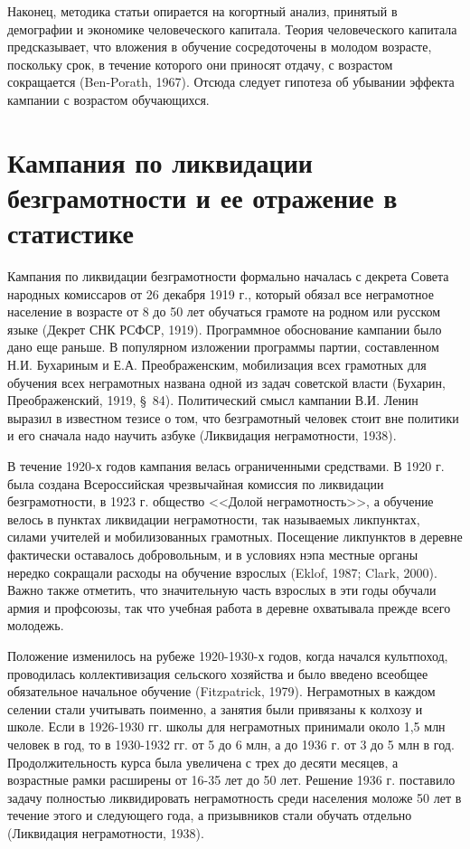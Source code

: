 \documentclass[12pt]{article}
\begin{document}
Наконец, методика статьи опирается на когортный анализ, принятый в демографии и экономике человеческого капитала. Теория человеческого капитала предсказывает, что вложения в обучение сосредоточены в молодом возрасте, поскольку срок, в течение которого они приносят отдачу, с возрастом сокращается (Ben-Porath, 1967). Отсюда следует гипотеза об убывании эффекта кампании с возрастом обучающихся.

\section{Кампания по ликвидации безграмотности и ее отражение в статистике}

Кампания по ликвидации безграмотности формально началась с декрета Совета народных комиссаров от 26 декабря 1919 г., который обязал все неграмотное население в возрасте от 8 до 50 лет обучаться грамоте на родном или русском языке (Декрет СНК РСФСР, 1919). Программное обоснование кампании было дано еще раньше. В популярном изложении программы партии, составленном Н.И. Бухариным и Е.А. Преображенским, мобилизация всех грамотных для обучения всех неграмотных названа одной из задач советской власти (Бухарин, Преображенский, 1919, §~84). Политический смысл кампании В.И. Ленин выразил в известном тезисе о том, что безграмотный человек стоит вне политики и его сначала надо научить азбуке (Ликвидация неграмотности, 1938).

В течение 1920-х годов кампания велась ограниченными средствами. В 1920 г. была создана Всероссийская чрезвычайная комиссия по ликвидации безграмотности, в 1923 г. общество <<Долой неграмотность>>, а обучение велось в пунктах ликвидации неграмотности, так называемых ликпунктах, силами учителей и мобилизованных грамотных. Посещение ликпунктов в деревне фактически оставалось добровольным, и в условиях нэпа местные органы нередко сокращали расходы на обучение взрослых (Eklof, 1987; Clark, 2000). Важно также отметить, что значительную часть взрослых в эти годы обучали армия и профсоюзы, так что учебная работа в деревне охватывала прежде всего молодежь.

Положение изменилось на рубеже 1920-1930-х годов, когда начался культпоход, проводилась коллективизация сельского хозяйства и было введено всеобщее обязательное начальное обучение (Fitzpatrick, 1979). Неграмотных в каждом селении стали учитывать поименно, а занятия были привязаны к колхозу и школе. Если в 1926-1930 гг. школы для неграмотных принимали около 1,5 млн человек в год, то в 1930-1932 гг. от 5 до 6 млн, а до 1936 г. от 3 до 5 млн в год. Продолжительность курса была увеличена с трех до десяти месяцев, а возрастные рамки расширены от 16-35 лет до 50 лет. Решение 1936 г. поставило задачу полностью ликвидировать неграмотность среди населения моложе 50 лет в течение этого и следующего года, а призывников стали обучать отдельно (Ликвидация неграмотности, 1938).
\end{document}
